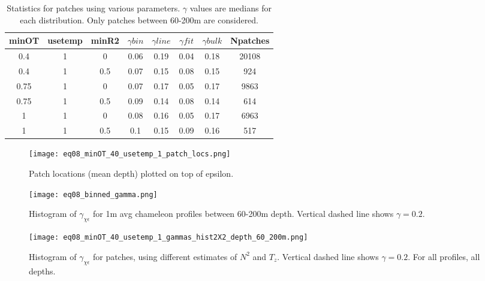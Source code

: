 \documentclass[11pt]{article}
\begin{document}
\begin{table}[htdp]
\caption{Statistics for patches using various parameters. $\gamma$ values are medians for each distribution. Only patches between 60-200m are considered.}
\begin{center}
\begin{tabular}{|c|c|c|c|c|c|c|c|}
\hline
minOT & usetemp & minR2 & $\gamma bin$ & $\gamma line$ & $\gamma fit$ & $\gamma bulk$ & Npatches \\
\hline
0.4 & 1 & 0 & 0.06 & 0.19 & 0.04 & 0.18 & 20108 \\
\hline
0.4 & 1 & 0.5 & 0.07 & 0.15 & 0.08 & 0.15 & 924 \\
\hline
0.75 & 1 & 0 & 0.07 & 0.17 & 0.05 & 0.17 & 9863 \\
\hline
0.75 & 1 & 0.5 & 0.09 & 0.14 & 0.08 & 0.14 & 614 \\
\hline
1 & 1 & 0 & 0.08 & 0.16 & 0.05 & 0.17 & 6963 \\
\hline
1 & 1 & 0.5 & 0.1 & 0.15 & 0.09 & 0.16 & 517 \\
\hline
\hline
\end{tabular}
\end{center}
\label{tab}
\end{table}%


\begin{figure}[htbp]
\texttt{[image: eq08\_minOT\_40\_usetemp\_1\_patch\_locs.png]}
\caption{Patch locations (mean depth) plotted on top of epsilon.}
\label{}
\end{figure}


\begin{figure}[htbp]
\texttt{[image: eq08\_binned\_gamma.png]}
\caption{Histogram of $\gamma_{\chi\epsilon}$ for 1m avg chameleon profiles between 60-200m depth. Vertical dashed line shows $\gamma=0.2$.}
\label{avggam}
\end{figure}

\begin{figure}[htbp]
\texttt{[image: eq08\_minOT\_40\_usetemp\_1\_gammas\_hist2X2\_depth\_60\_200m.png]}
\caption{Histogram of $\gamma_{\chi\epsilon}$ for patches, using different estimates of $N^2$ and $T_z$. Vertical dashed line shows $\gamma=0.2$. For all profiles, all depths.}
\label{patchgam}
\end{figure}

\end{document}
